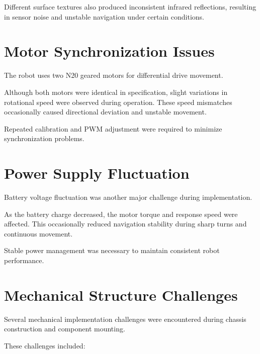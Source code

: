 \documentclass[12pt,a4paper,oneside]{report}
\begin{document}
Different surface textures also produced inconsistent infrared reflections, resulting in sensor noise and unstable navigation under certain conditions.


\section{Motor Synchronization Issues}

The robot uses two N20 geared motors for differential drive movement.

Although both motors were identical in specification, slight variations in rotational speed were observed during operation. These speed mismatches occasionally caused directional deviation and unstable movement.

Repeated calibration and PWM adjustment were required to minimize synchronization problems.


\section{Power Supply Fluctuation}

Battery voltage fluctuation was another major challenge during implementation.

As the battery charge decreased, the motor torque and response speed were affected. This occasionally reduced navigation stability during sharp turns and continuous movement.

Stable power management was necessary to maintain consistent robot performance.


\section{Mechanical Structure Challenges}

Several mechanical implementation challenges were encountered during chassis construction and component mounting.

These challenges included:
\end{document}
